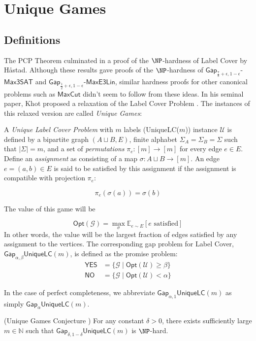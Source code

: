\section{Unique Games}
\subsection{Definitions}
The PCP Theorem culminated in a proof of the $\NP$-hardness of Label Cover by H\aa stad. Although these results gave proofs of the $\NP$-hardness of $\mathsf{Gap}_{\frac{7}{8} + \epsilon, 1- \epsilon}$-$\mathsf{Max3SAT}$ and $\mathsf{Gap}_{\frac{1}{2} + \epsilon, 1- \epsilon}$-$\mathsf{MaxE3Lin}$, similar hardness proofs for other canonical problems such as $\mathsf{MaxCut}$ didn't seem to follow from these ideas. In his seminal paper, Khot proposed a relaxation of the Label Cover Problem \cite{khot2002power}. The instances of this relaxed version are called \emph{Unique Games}:

\begin{definition}
  A \emph{Unique Label Cover Problem} with $m$ labels (UniqueLC($m$)) instance $\mathcal{U}$ is defined by a bipartite graph $(A \sqcup B,E)$, finite alphabet $\Sigma_A = \Sigma_B = \Sigma$ such that $|\Sigma| = m$, and a set of \emph{permutations} $\pi_e:[m] \rightarrow [m]$ for every edge $e \in E$. Define an \emph{assignment} as consisting of a map $\sigma: A \sqcup B \rightarrow [m]$. An edge $e = (a,b) \in E$ is said to be satisfied by this assignment if the assignment is compatible with projection $\pi_e$:

  \begin{equation}
    \pi_e(\sigma(a)) = \sigma(b)
  \end{equation}

  The value of this game will be

  \begin{equation} \label{optvalLC}
    \mathsf{Opt}(\mathcal{G}) = \max_{\sigma} \mathbb{E}_{e \sim E}[e \text{ satisfied}]
  \end{equation}
  In other words, the value will be the largest fraction of edges satisfied by any assignment to the vertices. The corresponding gap problem for Label Cover, $\mathsf{Gap}_{\alpha,\beta}\mathsf{UniqueLC}(m)$, is defined as the promise problem:
  \begin{align*}
      \mathsf{YES} & = \{\mathcal{G} \mid \mathsf{Opt}(\mathcal{U}) \geq \beta\} \\
      \mathsf{NO} & = \{\mathcal{G} \mid \mathsf{Opt}(\mathcal{U}) < \alpha \}
  \end{align*}

  In the case of perfect completeness, we abbreviate $\mathsf{Gap}_{\alpha,1}\mathsf{UniqueLC}(m)$ as simply $\mathsf{Gap}_{\alpha}\mathsf{UniqueLC}(m)$.
\end{definition}

\begin{theorem} (Unique Games Conjecture \cite{khot2002power})
  For any constant $\delta > 0$, there exists sufficiently large $m \in \mathbb{N}$ such that $\mathsf{Gap}_{\delta,1-\delta}\mathsf{UniqueLC}(m)$ is $\NP$-hard.
\end{theorem}

